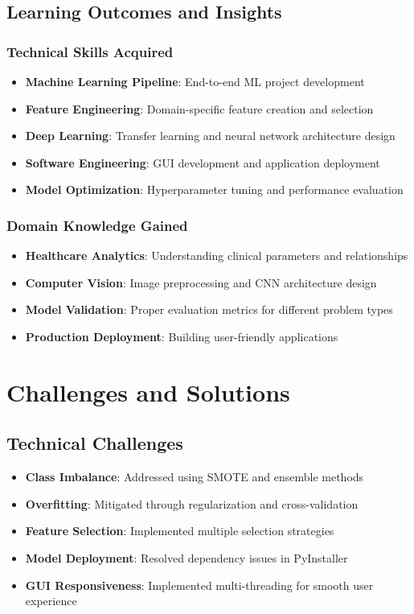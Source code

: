 \documentclass[12pt, a4paper]{article}
\begin{document}
\subsection{Learning Outcomes and Insights}

\subsubsection{Technical Skills Acquired}
\begin{itemize}
    \item \textbf{Machine Learning Pipeline}: End-to-end ML project development
    \item \textbf{Feature Engineering}: Domain-specific feature creation and selection
    \item \textbf{Deep Learning}: Transfer learning and neural network architecture design
    \item \textbf{Software Engineering}: GUI development and application deployment
    \item \textbf{Model Optimization}: Hyperparameter tuning and performance evaluation
\end{itemize}

\subsubsection{Domain Knowledge Gained}
\begin{itemize}
    \item \textbf{Healthcare Analytics}: Understanding clinical parameters and relationships
    \item \textbf{Computer Vision}: Image preprocessing and CNN architecture design
    \item \textbf{Model Validation}: Proper evaluation metrics for different problem types
    \item \textbf{Production Deployment}: Building user-friendly applications
\end{itemize}

\section{Challenges and Solutions}

\subsection{Technical Challenges}
\begin{itemize}
    \item \textbf{Class Imbalance}: Addressed using SMOTE and ensemble methods
    \item \textbf{Overfitting}: Mitigated through regularization and cross-validation
    \item \textbf{Feature Selection}: Implemented multiple selection strategies
    \item \textbf{Model Deployment}: Resolved dependency issues in PyInstaller
    \item \textbf{GUI Responsiveness}: Implemented multi-threading for smooth user experience
\end{itemize}
\end{document}
